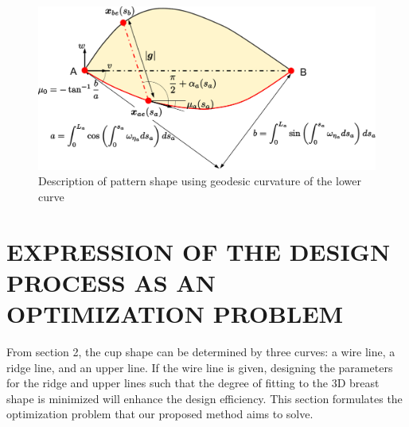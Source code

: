 \documentclass[E]{scitrans}
\begin{document}
\begin{figure}[thpb]
	\centering
	\includegraphics[width = \columnwidth]{./figure/PatternImage2.eps}
	\caption{Description of pattern shape using geodesic curvature of the lower curve}
	\label{fig:PatternImage}
\end{figure}
\section*{EXPRESSION OF THE DESIGN PROCESS AS AN OPTIMIZATION PROBLEM}
From section 2, the cup shape can be determined by three curves: a wire line, a ridge line, and an upper line. If the wire line is given, designing the parameters for the ridge and upper lines such that the degree of fitting to the 3D breast shape is minimized will enhance the design efficiency. This section formulates the optimization problem that our proposed method aims to solve.
\end{document}
